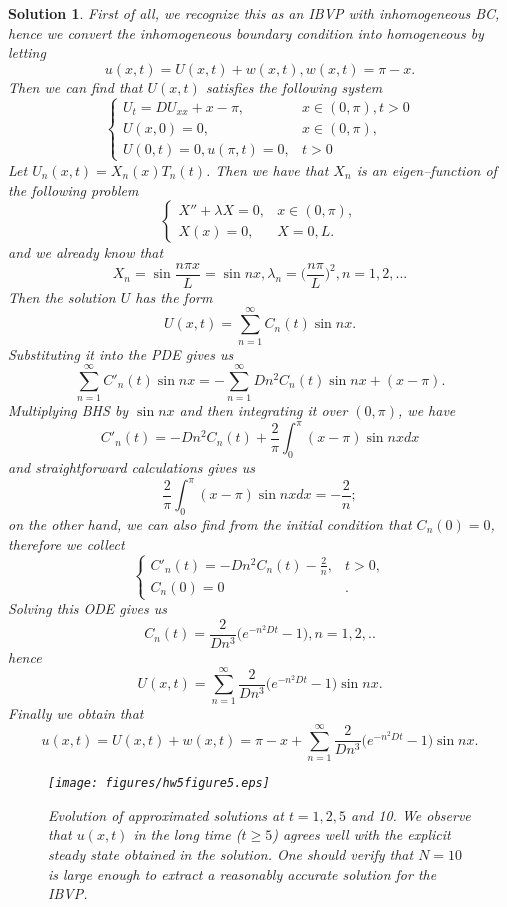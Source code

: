 \documentclass[6pt]{article}
\newtheorem{solution}{Solution}
\numberwithin{equation}{section}
\begin{document}
\begin{enumerate}
\begin{solution}
First of all, we recognize this as an IBVP with inhomogeneous BC, hence we convert the inhomogeneous boundary condition into homogeneous by letting
\[u(x,t)=U(x,t)+w(x,t),w(x,t)=\pi-x.\]
Then we can find that $U(x,t)$ satisfies the following system
\begin{equation}\label{4homo}
\left\{
\begin{array}{ll}
U_t=DU_{xx}+x-\pi,& x\in(0,\pi),t>0\\
U(x,0)=0,&x\in(0,\pi),\\
U(0,t)=0, u(\pi,t)=0, &t>0
\end{array}
\right.
\end{equation}
Let $U_n(x,t)=X_n(x)T_n(t)$.  Then we have that $X_n$ is an eigen--function of the following problem
\begin{equation}
\left\{
\begin{array}{ll}
X''+\lambda X=0,& x\in(0,\pi),\\
X(x)=0, &X=0,L.
\end{array}
\right.
\end{equation}
and we already know that
\[X_n=\sin \frac{n\pi x}{L}=\sin nx,\lambda_n=\Big(\frac{n\pi}{L}\Big)^2,n=1,2,...\]
Then the solution $U$ has the form
\[U(x,t)=\sum_{n=1}^\infty C_n(t)\sin nx.\]
Substituting it into the PDE gives us
\[\sum_{n=1}^\infty C'_n(t)\sin nx=-\sum_{n=1}^\infty Dn^2C_n(t)\sin nx+(x-\pi).\]
Multiplying BHS by $\sin nx$ and then integrating it over $(0,\pi)$, we have
\[C'_n(t)=-Dn^2C_n(t)+\frac{2}{\pi}\int_0^\pi(x-\pi)\sin nx dx\]
and straightforward calculations gives us
\[\frac{2}{\pi}\int_0^\pi(x-\pi)\sin nx dx=-\frac{2}{n};\]
on the other hand, we can also find from the initial condition that $C_n(0)=0$, therefore we collect
\begin{equation}
\left\{
\begin{array}{ll}
C'_n(t)=-Dn^2C_n(t)-\frac{2}{n},& t>0,\\
C_n(0)=0 &.
\end{array}
\right.
\end{equation}
Solving this ODE gives us
\[C_n(t)=\frac{2}{Dn^3}\Big(e^{-n^2Dt}-1\Big),n=1,2,..\]
hence
\[U(x,t)=\sum_{n=1}^\infty \frac{2}{Dn^3}\Big(e^{-n^2Dt}-1\Big)\sin nx.\]
Finally we obtain that
\[u(x,t)=U(x,t)+w(x,t)=\pi-x+\sum_{n=1}^\infty \frac{2}{Dn^3}\Big(e^{-n^2Dt}-1\Big)\sin nx.\]

\begin{figure}[h]\vspace{-1mm}
  \centering
\texttt{[image: figures/hw5figure5.eps]}
\caption{Evolution of approximated solutions at $t=1,2,5$ and 10.  We observe that  $u(x,t)$ in the long time ($t\geq5$) agrees well with the explicit steady state obtained in the solution.  One should verify that $N=10$ is large enough to extract a reasonably accurate solution for the IBVP.}
\end{figure}


\end{solution}
\end{enumerate}
\end{document}
